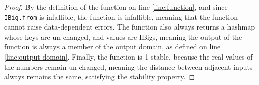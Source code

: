 \documentclass{article}
\begin{document}
\begin{proof}
    By the definition of the function on line \ref{line:function},
    and since \texttt{IBig.from} is infallible, the function is infallible, 
    meaning that the function cannot raise data-dependent errors.
    The function also always returns a hashmap whose keys are un-changed, and values are IBigs,
    meaning the output of the function is always a member of the output domain,
    as defined on line \ref{line:output-domain}.
    Finally, the function is 1-stable, because the real values of the numbers remain un-changed,
    meaning the distance between adjacent inputs always remains the same, satisfying the stability property.
\end{proof}
\end{document}
